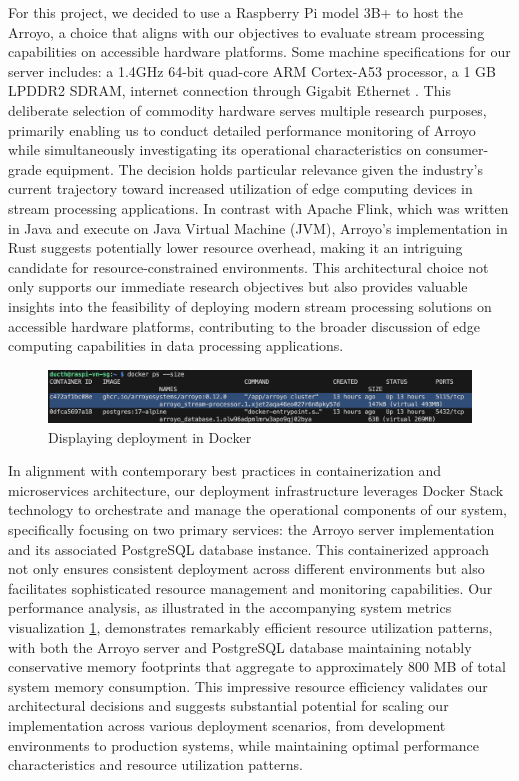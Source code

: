 For this project, we decided to use a Raspberry Pi model 3B+ to host the Arroyo, a choice that
aligns with our objectives to evaluate stream processing capabilities on accessible hardware
platforms. Some machine specifications for our server includes: a 1.4GHz 64-bit quad-core ARM
Cortex-A53 processor, a 1 GB LPDDR2 SDRAM, internet connection through Gigabit Ethernet
\cite{raspberrypi}. This deliberate selection of commodity hardware serves multiple research
purposes, primarily enabling us to conduct detailed performance monitoring of Arroyo while
simultaneously investigating its operational characteristics on consumer-grade equipment. The
decision holds particular relevance given the industry's current trajectory toward increased
utilization of edge computing devices in stream processing applications. In contrast with Apache
Flink, which was written in Java and execute on Java Virtual Machine (JVM), Arroyo's
implementation in Rust suggests potentially lower resource overhead, making it an intriguing
candidate for resource-constrained environments. This architectural choice not only supports our
immediate research objectives but also provides valuable insights into the feasibility of deploying
modern stream processing solutions on accessible hardware platforms, contributing to the broader
discussion of edge computing capabilities in data processing applications.

\begin{figure}[H]
    \centering
    \includegraphics[width=\textwidth]{Images/docker_stack_deployment.png}
    \vspace{1em}
    \caption{Displaying deployment in Docker}
    \label{fig:docker_stack}
\end{figure}

In alignment with contemporary best practices in containerization and microservices architecture,
our deployment infrastructure leverages Docker Stack \cite{docker_stack} technology to orchestrate
and manage the operational components of our system, specifically focusing on two primary services:
the Arroyo server implementation and its associated PostgreSQL database instance. This containerized
approach not only ensures consistent deployment across different environments but also facilitates
sophisticated resource management and monitoring capabilities. Our performance analysis, as
illustrated in the accompanying system metrics visualization \ref{fig:docker_stack}, demonstrates
remarkably efficient resource utilization patterns, with both the Arroyo server and PostgreSQL
database maintaining notably conservative memory footprints that aggregate to approximately 800 MB
of total system memory consumption. This impressive resource efficiency validates our architectural
decisions and suggests substantial potential for scaling our implementation across various
deployment scenarios, from development environments to production systems, while maintaining optimal
performance characteristics and resource utilization patterns.

